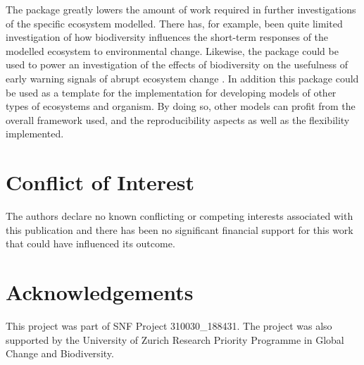 \documentclass[preprint,12pt, a4paper]{elsarticle}
\begin{document}
The package greatly lowers the amount of work required in further
investigations of the specific ecosystem modelled. There has, for
example, been quite limited investigation of how biodiversity influences
the short-term responses of the modelled ecosystem to environmental
change. Likewise, the package could be used to power an investigation of
the effects of biodiversity on the usefulness of early warning signals
of abrupt ecosystem change \citep{Scheffer2009}. In addition this
package could be used as a template for the implementation for
developing models of other types of ecosystems and organism. By doing
so, other models can profit from the overall framework used, and the
reproducibility aspects as well as the flexibility implemented.

\hypertarget{conflict-of-interest}{%
\section{Conflict of Interest}\label{conflict-of-interest}}

The authors declare no known conflicting or competing interests
associated with this publication and there has been no significant
financial support for this work that could have influenced its outcome.

\hypertarget{acknowledgements}{%
\section{Acknowledgements}\label{acknowledgements}}

This project was part of SNF Project 310030\_188431. The project was
also supported by the University of Zurich Research Priority Programme
in Global Change and Biodiversity.

\renewcommand\refname{References}

 
\end{document}
